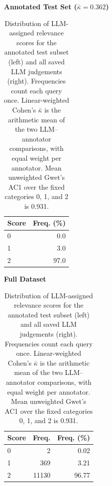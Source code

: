 \begin{table}[t]
\centering
\footnotesize
\caption{Distribution of LLM-assigned relevance scores for
the annotated test subset (left) and all saved LLM judgements (right).
Frequencies count each query once. Linear-weighted Cohen's $\bar\kappa$ is
the arithmetic mean of the two LLM--annotator comparisons, with equal weight
per annotator.
Mean unweighted Gwet's AC1 over the fixed categories 0, 1, and 2 is 0.931.}
\label{tab:llm-annotation-results}

\begin{minipage}[t]{0.48\textwidth}
\centering
\textbf{Annotated Test Set ($\bar\kappa = 0.362$)}\\[4pt]
\begin{tabularx}{\linewidth}{@{}Xr@{}}
\toprule
\textbf{Score} & \textbf{Freq. (\%)} \\
\midrule
0 & 0.0 \\
1 & 3.0 \\
2 & 97.0 \\
\bottomrule
\end{tabularx}
\end{minipage}
\hfill
\begin{minipage}[t]{0.48\textwidth}
\centering
\textbf{Full Dataset}\\[4pt]
\begin{tabularx}{\linewidth}{@{}Xrr@{}}
\toprule
\textbf{Score} & \textbf{Freq.} & \textbf{Freq. (\%)} \\
\midrule
0 & 2 & 0.02 \\
1 & 369 & 3.21 \\
2 & 11130 & 96.77 \\
\bottomrule
\end{tabularx}
\end{minipage}
\vspace{-0.5cm}
\end{table}

